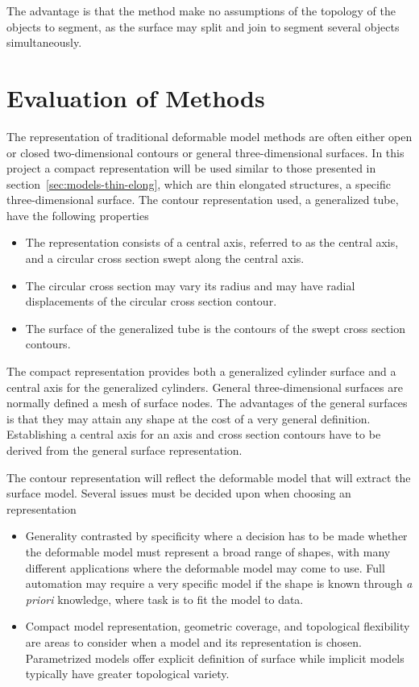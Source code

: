 The advantage is that the method make no assumptions of the topology
of the objects to segment, as the surface may split and join to
segment several objects simultaneously. 


\section{Evaluation of Methods}
\label{sec:evaluation-methods}

The representation of traditional deformable model methods are often
either open or closed two-dimensional contours or general
three-dimensional surfaces.  In this project a compact representation
will be used similar to those presented in
section~\ref{sec:models-thin-elong}, which are thin elongated
structures, a specific three-dimensional surface.  The contour
representation used, a generalized tube, have the following properties
\begin{itemize}
\item The representation consists of a central axis, referred to as
  the central axis, and a circular cross section swept along the central axis.
\item The circular cross section may vary its radius and may have radial
  displacements of the circular cross section contour.
\item The surface of the generalized tube is the contours of the swept
  cross section contours.
\end{itemize}
The  compact  representation  provides  both  a  generalized  cylinder
surface  and a central  axis for  the generalized  cylinders.  General
three-dimensional  surfaces are  normally  defined a  mesh of  surface
nodes. The advantages of the  general surfaces is that they may attain
any shape  at the  cost of a  very general definition.  Establishing a
central axis for an axis and cross section contours have to be derived
from the general surface representation.


The contour representation will reflect the deformable model that will extract
the surface model. Several issues must be decided upon when choosing
an representation
\begin{itemize}
\item Generality contrasted by specificity where a decision has to be
  made whether the deformable model must represent a broad range of
  shapes, with many different applications where the deformable model
  may come to use. Full automation may require a very specific model
  if the shape is known through \emph{a priori} knowledge, where task
  is to fit the model to data.
\item Compact model representation, geometric coverage, and
  topological flexibility are areas to consider when a model and its
  representation is chosen. Parametrized models offer explicit
  definition of surface while implicit models typically have greater
  topological variety.
\end{itemize}


